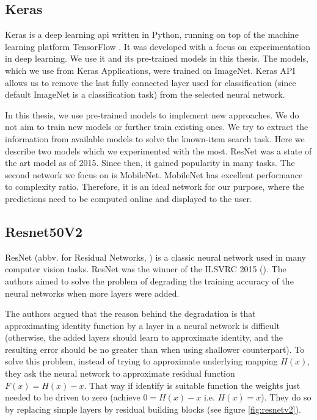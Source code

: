 \subsection{Keras}

Keras \citep{chollet2015keras} is a deep learning \acrshort{api} written in Python, running on top of the machine learning platform TensorFlow \citep{tensorflow2015-whitepaper}. It was developed with a focus on experimentation in deep learning. We use it and its pre-trained models in this thesis. The models, which we use from Keras Applications, were trained on ImageNet. Keras API allows us to remove the last fully connected layer used for classification (since default ImageNet is a classification task) from the selected neural network.

In this thesis, we use pre-trained models to implement new approaches. We do not aim to train new models or further train existing ones. We try to extract the information from available models to solve the known-item search task. Here we describe two models which we experimented with the most. ResNet was a state of the art model as of 2015. Since then, it gained popularity in many tasks. The second network we focus on is MobileNet. MobileNet has excellent performance to complexity ratio. Therefore, it is an ideal network for our purpose, where the predictions need to be computed online and displayed to the user.

\subsection*{Resnet50V2}

ResNet (abbv. for Residual Networks, \cite{resnet}) is a classic neural network used in many computer vision tasks. ResNet was the winner of the ILSVRC 2015 (\citep{ILSVRC15}). The authors aimed to solve the problem of degrading the training accuracy of the neural networks when more layers were added. 

The authors argued that the reason behind the degradation is that approximating identity function by a layer in a neural network is difficult (otherwise, the added layers should learn to approximate identity, and the resulting error should be no greater than when using shallower counterpart). To solve this problem, instead of trying to approximate underlying mapping $H(x)$, they ask the neural network to approximate residual function $F(x)=H(x) - x$. That way if identify is suitable function the weights just needed to be driven to zero (achieve $0 = H(x) - x$ i.e. $H(x) = x$). They do so by replacing simple layers by residual building blocks (see figure \ref{fig:resnetv2}).


